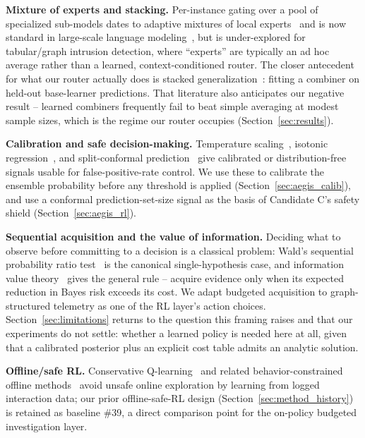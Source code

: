 \documentclass[journal]{IEEEtran}
\begin{document}
\textbf{Mixture of experts and stacking.} Per-instance gating over a pool of
specialized sub-models dates to adaptive mixtures of local
experts~\cite{jacobs1991moe} and is now standard in large-scale language
modeling~\cite{shazeer2017moe,fedus2022switch}, but is under-explored for
tabular/graph intrusion detection, where ``experts'' are typically an ad hoc
average rather than a learned, context-conditioned router. The closer
antecedent for what our router actually does is stacked
generalization~\cite{wolpert1992stacked}: fitting a combiner on held-out
base-learner predictions. That literature also anticipates our negative
result -- learned combiners frequently fail to beat simple averaging at
modest sample sizes, which is the regime our router occupies
(Section~\ref{sec:results}).

\textbf{Calibration and safe decision-making.} Temperature
scaling~\cite{guo2017calibration}, isotonic
regression~\cite{zadrozny2002isotonic}, and split-conformal
prediction~\cite{angelopoulos2021conformal} give calibrated or
distribution-free signals usable for false-positive-rate control. We use
these to calibrate the ensemble probability before any threshold is applied
(Section~\ref{sec:aegis_calib}), and use a conformal prediction-set-size
signal as the basis of Candidate C's safety shield
(Section~\ref{sec:aegis_rl}).

\textbf{Sequential acquisition and the value of information.} Deciding what
to observe before committing to a decision is a classical problem: Wald's
sequential probability ratio test~\cite{wald1945sequential} is the canonical
single-hypothesis case, and information value theory~\cite{howard1966voi}
gives the general rule -- acquire evidence only when its expected reduction
in Bayes risk exceeds its cost. We adapt budgeted acquisition to
graph-structured telemetry as one of the RL layer's action choices.
Section~\ref{sec:limitations} returns to the question this framing raises and
that our experiments do not settle: whether a learned policy is needed here
at all, given that a calibrated posterior plus an explicit cost table admits
an analytic solution.

\textbf{Offline/safe RL.} Conservative Q-learning~\cite{kumar2020cql} and
related behavior-constrained offline methods~\cite{fujimoto2019bcq} avoid
unsafe online exploration by learning from logged interaction data; our prior
offline-safe-RL design (Section~\ref{sec:method_history}) is retained as
baseline \#39, a direct comparison point for the on-policy budgeted
investigation layer.
\end{document}
